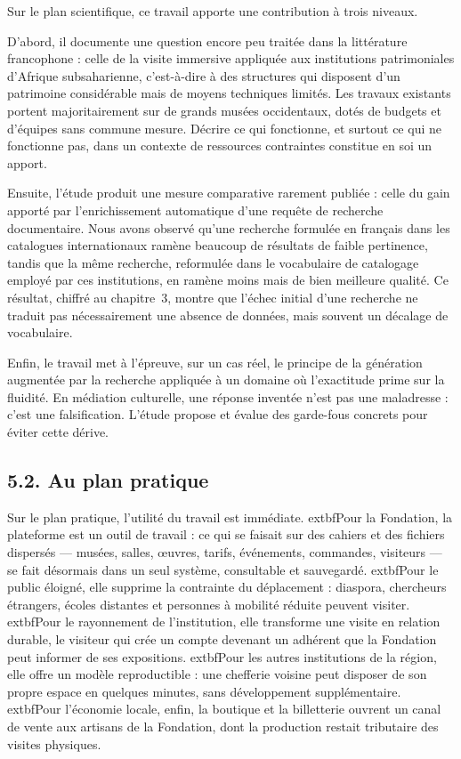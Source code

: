 Sur le plan scientifique, ce travail apporte une contribution à trois niveaux.

D'abord, il documente une question encore peu traitée dans la littérature
francophone : celle de la visite immersive appliquée aux institutions
patrimoniales d'Afrique subsaharienne, c'est-à-dire à des structures qui
disposent d'un patrimoine considérable mais de moyens techniques limités. Les
travaux existants portent majoritairement sur de grands musées occidentaux,
dotés de budgets et d'équipes sans commune mesure. Décrire ce qui fonctionne, et surtout ce qui ne fonctionne pas, dans un contexte de ressources contraintes
constitue en soi un apport.

Ensuite, l'étude produit une mesure comparative rarement publiée : celle du gain
apporté par l'enrichissement automatique d'une requête de recherche
documentaire. Nous avons observé qu'une recherche formulée en français dans les
catalogues internationaux ramène beaucoup de résultats de faible pertinence,
tandis que la même recherche, reformulée dans le vocabulaire de catalogage
employé par ces institutions, en ramène moins mais de bien meilleure qualité.
Ce résultat, chiffré au chapitre~3, montre que l'échec initial d'une recherche
ne traduit pas nécessairement une absence de données, mais souvent un décalage
de vocabulaire.

Enfin, le travail met à l'épreuve, sur un cas réel, le principe de la génération
augmentée par la recherche appliquée à un domaine où l'exactitude prime sur la
fluidité. En médiation culturelle, une réponse inventée n'est pas une
maladresse : c'est une falsification. L'étude propose et évalue des garde-fous
concrets pour éviter cette dérive.

\subsection*{5.2. Au plan pratique}

Sur le plan pratique, l'utilité du travail est immédiate. 	extbf{Pour la
Fondation}, la plateforme est un outil de travail : ce qui se faisait sur des
cahiers et des fichiers dispersés — musées, salles, œuvres, tarifs, événements,
commandes, visiteurs — se fait désormais dans un seul système, consultable et
sauvegardé. 	extbf{Pour le public éloigné}, elle supprime la contrainte du
déplacement : diaspora, chercheurs étrangers, écoles distantes et personnes à
mobilité réduite peuvent visiter. 	extbf{Pour le rayonnement de
l'institution}, elle transforme une visite en relation durable, le visiteur qui
crée un compte devenant un adhérent que la Fondation peut informer de ses
expositions. 	extbf{Pour les autres institutions de la région}, elle offre un
modèle reproductible : une chefferie voisine peut disposer de son propre espace
en quelques minutes, sans développement supplémentaire. 	extbf{Pour l'économie
locale}, enfin, la boutique et la billetterie ouvrent un canal de vente aux
artisans de la Fondation, dont la production restait tributaire des visites
physiques.

